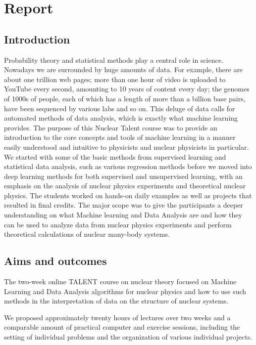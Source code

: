 \documentclass[prc,amsart,english]{revtex4}
\begin{document}
\section{Report }

\subsection{Introduction}
Probability theory and statistical methods play a central role in
science. Nowadays we are surrounded by huge amounts of data. For
example, there are about one trillion web pages; more than one hour of
video is uploaded to YouTube every second, amounting to 10 years of
content every day; the genomes of 1000s of people, each of which has a
length of more than a billion base pairs, have been sequenced by
various labs and so on. This deluge of data calls for automated
methods of data analysis, which is exactly what machine learning
provides. The purpose of this Nuclear Talent course was to provide an
introduction to the core concepts and tools of machine learning in a
manner easily understood and intuitive to physicists and nuclear
physicists in particular. We started with some of the basic methods
from supervised learning and statistical data analysis, such as
various regression methods before we moved into deep learning methods
for both supervised and unsupervised learning, with an emphasis on the
analysis of nuclear physics experiments and theoretical nuclear
physics. The students worked on hands-on daily examples as well as
projects that resulted in final credits.  The major scope was to give the
participants a deeper understanding on what Machine learning and Data
Analysis are and how they can be used to analyze data from nuclear
physics experiments and perform theoretical calculations of nuclear
many-body systems.


\subsection{Aims and outcomes}

The two-week online TALENT course on nuclear theory focused on Machine
Learning and Data Analysis algorithms for nuclear physics and how to
use such methods in the interpretation of data on the structure of
nuclear systems.

We proposed approximately twenty hours of lectures over two weeks and
a comparable amount of practical computer and exercise sessions,
including the setting of individual problems and the organization of
various individual projects.
\end{document}
